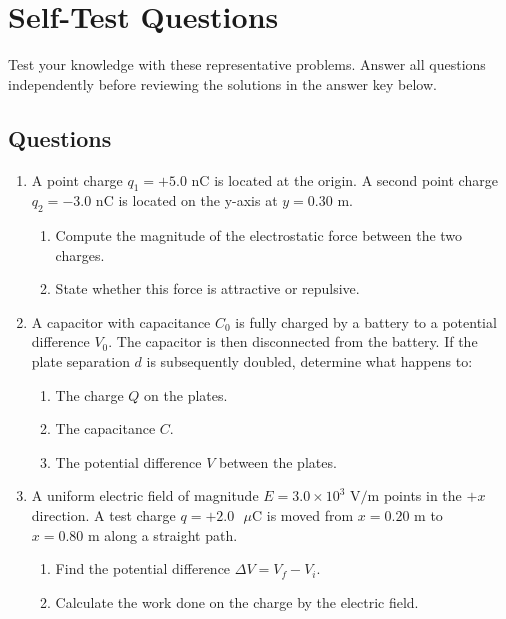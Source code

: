 \section*{Self-Test Questions}

Test your knowledge with these representative problems. Answer all questions independently before reviewing the solutions in the answer key below.

\subsection*{Questions}
\begin{enumerate}[label=\textbf{Q\arabic*.}]
    \item A point charge $q_1 = +5.0\text{ nC}$ is located at the origin. A second point charge $q_2 = -3.0\text{ nC}$ is located on the y-axis at $y = 0.30\text{ m}$.
    \begin{enumerate}
        \item Compute the magnitude of the electrostatic force between the two charges.
        \item State whether this force is attractive or repulsive.
    \end{enumerate}
    
    \item A capacitor with capacitance $C_0$ is fully charged by a battery to a potential difference $V_0$. The capacitor is then disconnected from the battery. If the plate separation $d$ is subsequently doubled, determine what happens to:
    \begin{enumerate}
        \item The charge $Q$ on the plates.
        \item The capacitance $C$.
        \item The potential difference $V$ between the plates.
    \end{enumerate}
    
    \item A uniform electric field of magnitude $E = 3.0 \times 10^3\text{ V/m}$ points in the $+x$ direction. A test charge $q = +2.0\text{ }\mu\text{C}$ is moved from $x = 0.20\text{ m}$ to $x = 0.80\text{ m}$ along a straight path.
    \begin{enumerate}
        \item Find the potential difference $\Delta V = V_f - V_i$.
        \item Calculate the work done on the charge by the electric field.
    \end{enumerate}
\end{enumerate}

